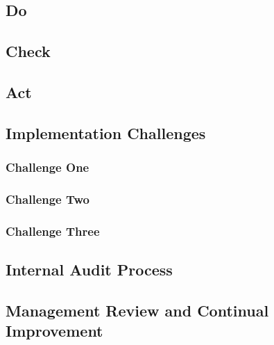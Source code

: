 
\subsection{Do}


\subsection{Check}


\subsection{Act}


\subsection{Implementation Challenges}

\subsubsection{Challenge One}

\subsubsection{Challenge Two}

\subsubsection{Challenge Three}


\subsection{Internal Audit Process}


\subsection{Management Review and Continual Improvement}


